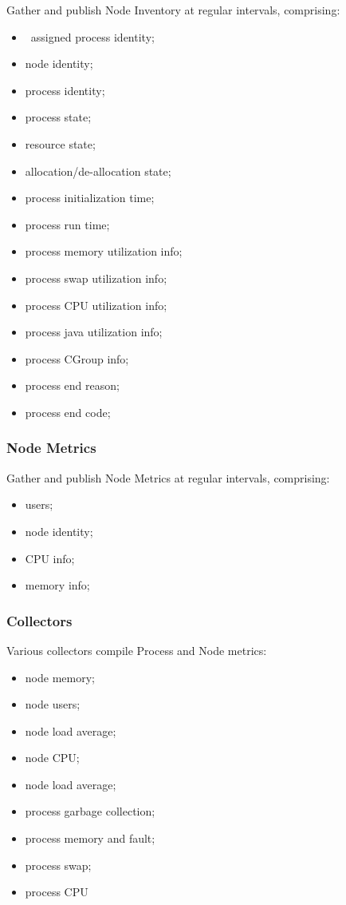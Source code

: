 \begin{itemize}
    Gather and publish Node Inventory at regular intervals, comprising:
    
    \begin{itemize}
      \item \varDUCC~assigned process identity;
      \item node identity;
      \item process identity;
      \item process state;
      \item resource state;
      \item allocation/de-allocation state;
      \item process initialization time;
      \item process run time;
      \item process memory utilization info;
      \item process swap utilization info;
      \item process CPU utilization info;
      \item process java utilization info;
      \item process CGroup info;
      \item process end reason;
      \item process end code;
      
    \end{itemize}
    
    \subsubsection{Node Metrics} 
    
    Gather and publish Node Metrics at regular intervals, comprising:
    
    \begin{itemize}
      \item users;
      \item node identity;
      \item CPU info;
      \item memory info;
    \end{itemize}
    
    \subsubsection{Collectors} 
    
    Various collectors compile Process and Node metrics:
    
    \begin{itemize}
      \item node memory;
      \item node users;
      \item node load average;
      \item node CPU;
      \item node load average;
      \item process garbage collection;
      \item process memory and fault;
      \item process swap;
      \item process CPU
    \end{itemize}
 

\end{itemize}
